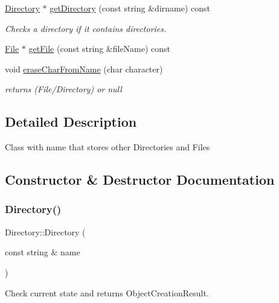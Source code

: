 \begin{DoxyCompactItemize}
\hyperlink{class_directory}{Directory} $\ast$ \hyperlink{class_directory_a1deb0931a93badb556a4faed75cbc033}{get\+Directory} (const string \&dirname) const
\begin{DoxyCompactList}\small\item\em Checks a directory if it contains directories. \end{DoxyCompactList}\item 
\hyperlink{class_file}{File} $\ast$ \hyperlink{class_directory_a3a7c1f0d955b7c3a73f6701db1fdf72b}{get\+File} (const string \&file\+Name) const
\item 
void \hyperlink{class_directory_ad8718bf810510f06e1932a8083ae09e2}{erase\+Char\+From\+Name} (char character)
\begin{DoxyCompactList}\small\item\em returns (File/\+Directory) or null \end{DoxyCompactList}\end{DoxyCompactItemize}


\subsection{Detailed Description}
Class with name that stores other Directories and Files 

\subsection{Constructor \& Destructor Documentation}
\mbox{\label{class_directory_a0b019225671a50ead8dbb22b97667676}} 
\subsubsection{\texorpdfstring{Directory()}{Directory()}}
{\footnotesize\ttfamily Directory\+::\+Directory (\begin{DoxyParamCaption}\item[{const string \&}]{name }\end{DoxyParamCaption})\hspace{0.3cm}{\ttfamily [inline]}}



Check current state and returns Object\+Creation\+Result. 

\mbox{\label{class_directory_affbde8714685c61601421097d621341d}} 
